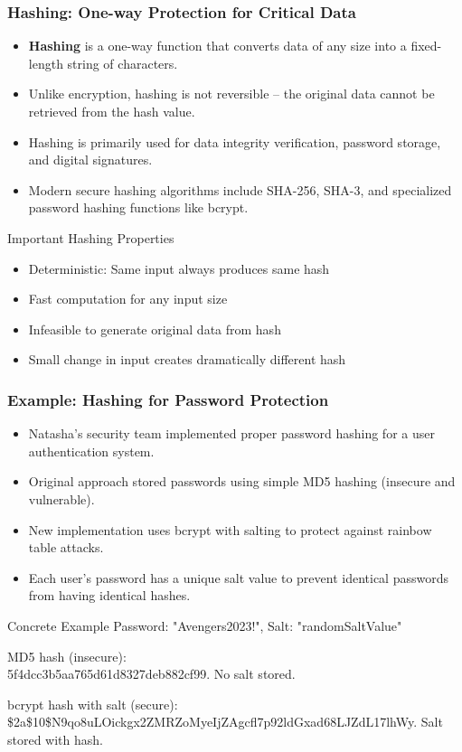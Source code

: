 \documentclass{beamer}
\begin{document}
\begin{frame}
\frametitle{Hashing: One-way Protection for Critical Data}
\begin{itemize}
    \item \textbf{Hashing} is a one-way function that converts data of any size into a fixed-length string of characters.
    \item Unlike encryption, hashing is not reversible – the original data cannot be retrieved from the hash value.
    \item Hashing is primarily used for data integrity verification, password storage, and digital signatures.
    \item Modern secure hashing algorithms include SHA-256, SHA-3, and specialized password hashing functions like bcrypt.
\end{itemize}

\begin{block}{Important Hashing Properties}
    \begin{itemize}
        \item Deterministic: Same input always produces same hash
        \item Fast computation for any input size
        \item Infeasible to generate original data from hash
        \item Small change in input creates dramatically different hash
    \end{itemize}
\end{block}
\end{frame}


\begin{frame}
    \frametitle{Example: Hashing for Password Protection}
    \begin{itemize}
        \item Natasha's security team implemented proper password hashing for a user authentication system.
        \item Original approach stored passwords using simple MD5 hashing (insecure and vulnerable).
        \item New implementation uses bcrypt with salting to protect against rainbow table attacks.
        \item Each user's password has a unique salt value to prevent identical passwords from having identical hashes.
    \end{itemize}
    
    \begin{exampleblock}{Concrete Example}
    Password: "Avengers2023!", Salt: "randomSaltValue"
    
    \smallskip
    MD5 hash (insecure): \\ 
    5f4dcc3b5aa765d61d8327deb882cf99. No salt stored.
    
    \smallskip
    bcrypt hash with salt (secure): \\
    \$2a\$10\$N9qo8uLOickgx2ZMRZoMyeIjZAgcfl7p92ldGxad68LJZdL17lhWy. Salt stored with hash.
    \end{exampleblock}
    \end{frame}
    
\end{document}
